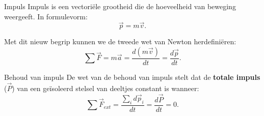 \begin{theo}[Impuls]{Impuls}
    Impuls is een vectoriële grootheid die de hoeveelheid van beweging weergeeft. In formulevorm: 
        \begin{equation*}
            \Vec{p} = m\Vec{v}.
        \end{equation*}
        
    \noindent Met dit nieuw begrip kunnen we de tweede wet van Newton herdefiniëren:
    \begin{equation*}
        \sum \Vec{F} = m\Vec{a} = \dfrac{d(m\Vec{v})}{dt} = \dfrac{d\Vec{p}}{dt}.
    \end{equation*}

    \vspace{-0.3cm}

\end{theo}

\begin{lem}{Behoud van impuls}
    De wet van de behoud van impuls stelt dat de \textbf{totale impuls} ($ \Vec{P} $) van een geïsoleerd stelsel van deeltjes constant is wanneer: 
    \begin{equation*}
         \sum \Vec{F}_{ext} = \dfrac{\sum_i d\Vec{p}_i}{dt} = \dfrac{d\Vec{P}}{dt} = 0.
    \end{equation*} 
\end{lem}


